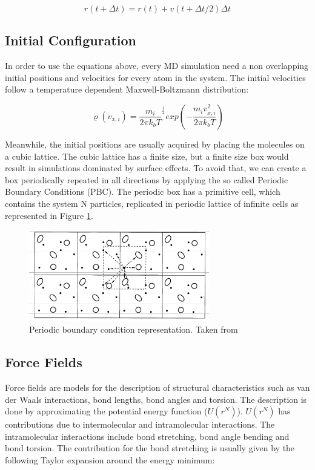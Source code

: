 \begin{equation}
r(t+ \Delta t) = r(t) +v(t+ \Delta t /2) \Delta t
\end{equation}

\subsection{Initial Configuration}

In order to use the equations above, every MD simulation need a non overlapping initial positions and velocities for every atom in the system. The initial velocities follow a temperature dependent Maxwell-Boltzmann distribution:

\begin{equation}
\varrho (v_{x,i}) = {\frac{m_{i}}{2 \pi k_{b} T}}^{\frac{1}{2}} exp(-\frac{m_{i}v_{x,i}^2}{2 \pi k_{b} T})
\end{equation}

Meanwhile, the initial positions are usually acquired by placing the molecules on a cubic lattice. The cubic lattice has a finite size, but  a finite size box would result in simulations dominated by surface effects. To avoid that, we can create a box periodically repeated in all directions by applying the so called Periodic Boundary Conditions (PBC). The periodic box has a primitive cell, which contains the system N particles, replicated in periodic lattice of infinite cells as represented in Figure \ref{fig:pbc}\cite{frenkel}.
\begin{figure}
	\centering
	\includegraphics[width=0.7\textwidth]{Figures/pbc}
	\caption{Periodic boundary condition representation. Taken from }
	\label{fig:pbc}
\end{figure}
\FloatBarrier

\subsection{Force Fields }
Force fields are models for the description of structural characteristics such as van der Waals interactions, bond lengths, bond angles and torsion. The description is done by approximating the potential energy function ($U(r^N)$). $U(r^N)$ has contributions due to intermolecular and intramolecular interactions. The intramolecular interactions include bond stretching, bond angle bending and bond torsion. The contribution for the bond stretching is usually given by the following Taylor expansion around the energy minimum:

